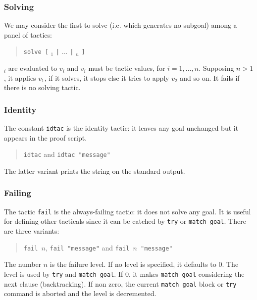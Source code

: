 \ErrMsg {}

\subsubsection{Solving}

We may consider the first to solve (i.e. which generates no subgoal) among a
panel of tactics:
\begin{quote}
{\tt solve [} {\tacexpr}$_1$ {\tt |} $...$ {\tt |} {\tacexpr}$_n$ {\tt ]}
\end{quote}
{\tacexpr}$_i$ are evaluated to $v_i$ and $v_i$ must be tactic values, for 
$i=1,...,n$. Supposing $n>1$, it applies $v_1$, if it solves, it stops else it
tries to apply $v_2$ and so on. It fails if there is no solving tactic.

\ErrMsg {}

\subsubsection{Identity}

The constant {\tt idtac} is the identity tactic: it leaves any goal
unchanged but it appears in the proof script.
\begin{quote}
{\tt idtac} and {\tt idtac "message"}
\end{quote}
The latter variant prints the string on the standard output.


\subsubsection{Failing}

The tactic {\tt fail} is the always-failing tactic: it does not solve
any goal. It is useful for defining other tacticals since it can be
catched by {\tt try} or {\tt match goal}. There are three variants:
\begin{quote}
{\tt fail $n$}, {\tt fail "message"} and {\tt fail $n$ "message"}
\end{quote}
The number $n$ is the failure level. If no level is specified, it
defaults to $0$.  The level is used by {\tt try} and {\tt match goal}.
If $0$, it makes {\tt match goal} considering the next clause
(backtracking). If non zero, the current {\tt match goal} block or
{\tt try} command is aborted and the level is decremented.

